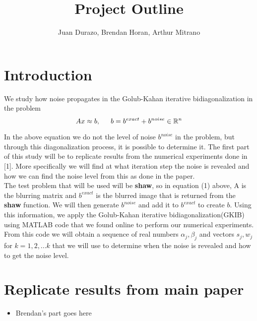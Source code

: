 \documentclass[11pt]{amsart}
\title{Project Outline}
\author{Juan Durazo, Brendan Horan, Arthur Mitrano}
\begin{document}
\maketitle
\section{Introduction}
We study how noise propagates in the Golub-Kahan iterative bidiagonalization in the problem 
\begin{equation}
Ax\approx b, \indent  b=b^{exact} + b^{noise} \in \mathbb{R}^n
\end{equation}

In the above equation we do not the level of noise $b^{noise}$ in the problem, but through this diagonalization process, it is possible to determine it.  The first part of this study will be to replicate results from the numerical experiments done in [1]. More specifically we will find at what iteration step the noise is revealed and how we can find the noise level from this as done in the paper.
\\

The test problem that will be used will be {\bf shaw}, so in equation (1) above, A is the blurring matrix and $b^{exact}$ is the blurred image that is returned from the {\bf shaw} function. We will then generate $b^{noise}$ and add it to $b^{exact}$ to create $b$. Using this information, we apply the Golub-Kahan iterative bidiagonalization(GKIB) using MATLAB code that we found online to perform our numerical experiments. From this code we will obtain a sequence of real numbers $\alpha_j,\beta_j$ and vectors $s_j,w_j$ for $k=1,2,...k$ that we will use to determine when the noise is revealed and how to get the noise level.


\section{Replicate results from main paper}
\begin{itemize}
\item Brendan's part goes here
\end{itemize}
\end{document}
